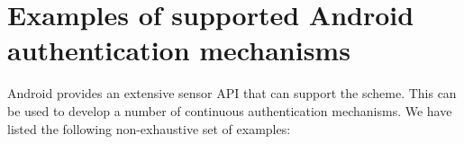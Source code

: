 
\chapter{Examples of supported Android authentication mechanisms} %

\label{AppendixC} %


Android provides an extensive sensor API that can support the scheme. This can be used to develop a number of continuous authentication mechanisms.  We have listed the following non-exhaustive set of examples:
